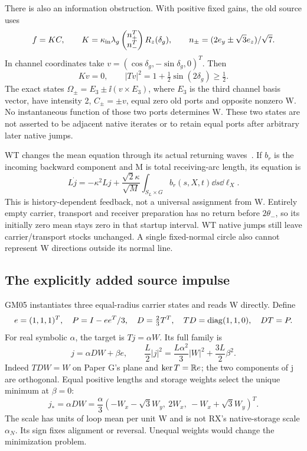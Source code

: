 There is also an information obstruction. With positive fixed gains, the old source uses
\begin{equation}\label{eq:ports}
f=KC,\qquad
K=\kappa_{\rm in}\lambda_g
\begin{pmatrix}n_+^T\\n_-^T\end{pmatrix}R_z(\delta_g),
\qquad n_\pm=(2e_y\pm\sqrt3e_z)/\sqrt7.
\end{equation}
In channel coordinates take \(v=(\cos\delta_g,-\sin\delta_g,0)^T\).
Then
\begin{equation}\label{eq:portnull}
Kv=0,\qquad |Tv|^2=1+\tfrac12\sin(2\delta_g)\ge\tfrac12.
\end{equation}
The exact states \(\Omega_\pm=E_3\pm\ii(v\times E_3)\), where \(E_3\) is the third channel basis vector, have intensity 2, \(C_\pm=\pm v\), equal zero old ports and opposite nonzero W. No instantaneous function of those two ports determines W. These two states are not asserted to be adjacent native iterates or to retain equal ports after arbitrary later native jumps.

WT changes the mean equation through its actual returning waves~\cite{WT,GM04}. If \(b_r\) is the incoming backward component and M is total receiving-arc length, its equation is
\begin{equation}\label{eq:WTmean}
L\dot j=-\kappa^2Lj+
\frac{\sqrt2\kappa}{\sqrt M}\int_{S_L\times G}b_r(s,X,t)\dd s\dd\ell_X.
\end{equation}
This is history-dependent feedback, not a universal assignment from W. Entirely empty carrier, transport and receiver preparation has no return before \(2\theta_-\), so its initially zero mean stays zero in that startup interval. WT native jumps still leave carrier/transport stocks unchanged. A single fixed-normal circle also cannot represent W directions outside its normal line.

\subsection{The explicitly added source impulse}
GM05 instantiates three equal-radius carrier states and reads W directly. Define
\begin{equation}\label{eq:lift}
e=(1,1,1)^T,\quad P=I-ee^T/3,\quad
D=\tfrac23T^T,\quad TD=\operatorname{diag}(1,1,0),\quad DT=P.
\end{equation}
For real symbolic \(\alpha\), the target is \(Tj=\alpha W\). Its full family is
\begin{equation}\label{eq:family}
j=\alpha DW+\beta e,\qquad
\frac L2|j|^2=\frac{L\alpha^2}{3}|W|^2+\frac{3L}{2}\beta^2.
\end{equation}
Indeed \(TDW=W\) on Paper G's plane and \(\ker T=\mathbb R e\); the two components of j are orthogonal. Equal positive lengths and storage weights select the unique minimum at \(\beta=0\):
\begin{equation}\label{eq:jstar}
j_*=\alpha DW=\frac{\alpha}{3}
(-W_x-\sqrt3W_y,\ 2W_x,\ -W_x+\sqrt3W_y)^T.
\end{equation}
The scale has units of loop mean per unit W and is not RX's native-storage scale \(\alpha_N\). Its sign fixes alignment or reversal. Unequal weights would change the minimization problem.

